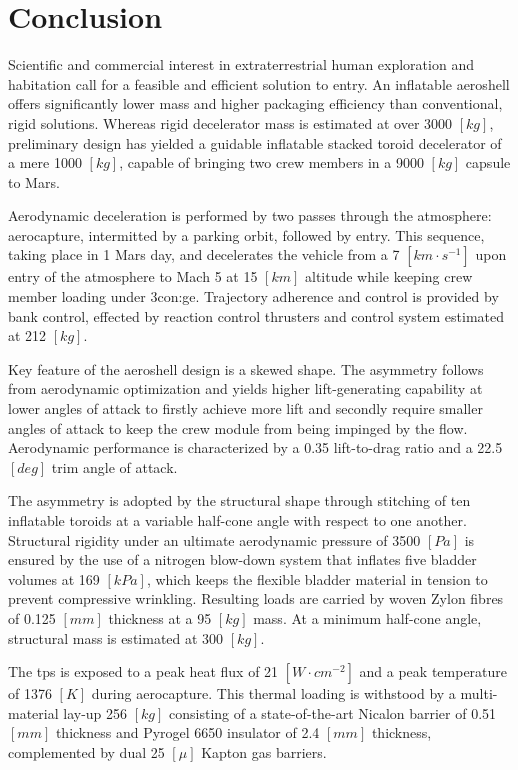 \section{Conclusion}

Scientific and commercial interest in extraterrestrial human exploration and habitation call for a feasible and efficient solution to entry. An inflatable aeroshell offers significantly lower mass and higher packaging efficiency than conventional, rigid solutions. Whereas rigid decelerator mass is estimated at over 3000 $ \left[ kg \right] $, preliminary design has yielded a guidable inflatable stacked toroid decelerator of a mere 1000 $ \left[ kg \right] $, capable of bringing two crew members in a 9000 $ \left[ kg \right] $ capsule to Mars.

Aerodynamic deceleration is performed by two passes through the atmosphere: aerocapture, intermitted by a parking orbit, followed by entry. This sequence, taking place in 1 Mars day, and decelerates the vehicle from a 7 $ \left[ km \cdot s^{-1} \right] $ upon entry of the atmosphere to Mach 5 at 15 $ \left[ km \right] $ altitude while keeping crew member loading under 3\gls{con:ge}. Trajectory adherence and control is provided by bank control, effected by reaction control thrusters and control system estimated at 212 $ \left[ kg \right] $.

Key feature of the aeroshell design is a skewed shape. The asymmetry follows from aerodynamic optimization and yields higher lift-generating capability at lower angles of attack to firstly achieve more lift and secondly require smaller angles of attack to keep the crew module from being impinged by the flow. Aerodynamic performance is characterized by a 0.35 lift-to-drag ratio and a 22.5 $ \left[ deg \right] $ trim angle of attack.

The asymmetry is adopted by the structural shape through stitching of ten inflatable toroids at a variable half-cone angle with respect to one another. Structural rigidity under an ultimate aerodynamic pressure of 3500 $ \left[ Pa \right] $ is ensured by the use of a nitrogen blow-down system that inflates five bladder volumes at 169 $ \left[ kPa \right] $, which keeps the flexible bladder material in tension to prevent compressive wrinkling. Resulting loads are carried by woven Zylon fibres of 0.125 $ \left[ mm \right] $ thickness at a 95 $ \left[ kg \right] $ mass. At a minimum half-cone angle,  structural mass is estimated at 300 $ \left[ kg \right] $. 

The \acrlong{tps} is exposed to a peak heat flux of 21 $ \left[ W \cdot cm^{-2} \right] $ and a peak temperature of 1376 $ \left[ K \right] $ during aerocapture. This thermal loading is withstood by a multi-material lay-up 256 $ \left[ kg \right] $ consisting of a state-of-the-art Nicalon barrier of 0.51 $ \left[ mm \right] $  thickness and Pyrogel 6650 insulator of 2.4 $ \left[ mm \right] $  thickness, complemented by dual 25 $ \left[ \mu \right] $  Kapton gas barriers. 

